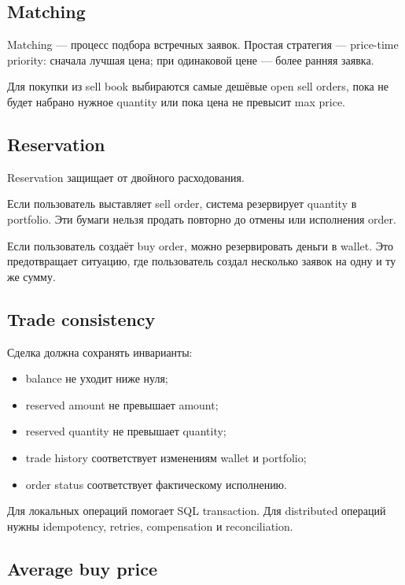 \documentclass[12pt,a4paper]{article}
\begin{document}
\subsection{Matching}

Matching --- процесс подбора встречных заявок. Простая стратегия --- price-time
priority: сначала лучшая цена; при одинаковой цене --- более ранняя заявка.

Для покупки из sell book выбираются самые дешёвые open sell orders, пока не будет
набрано нужное quantity или пока цена не превысит max price.

\subsection{Reservation}

Reservation защищает от двойного расходования.

Если пользователь выставляет sell order, система резервирует quantity в portfolio.
Эти бумаги нельзя продать повторно до отмены или исполнения order.

Если пользователь создаёт buy order, можно резервировать деньги в wallet. Это
предотвращает ситуацию, где пользователь создал несколько заявок на одну и ту же
сумму.

\subsection{Trade consistency}

Сделка должна сохранять инварианты:
\begin{itemize}
    \item balance не уходит ниже нуля;
    \item reserved amount не превышает amount;
    \item reserved quantity не превышает quantity;
    \item trade history соответствует изменениям wallet и portfolio;
    \item order status соответствует фактическому исполнению.
\end{itemize}

Для локальных операций помогает SQL transaction. Для distributed операций нужны
idempotency, retries, compensation и reconciliation.

\subsection{Average buy price}
\end{document}
